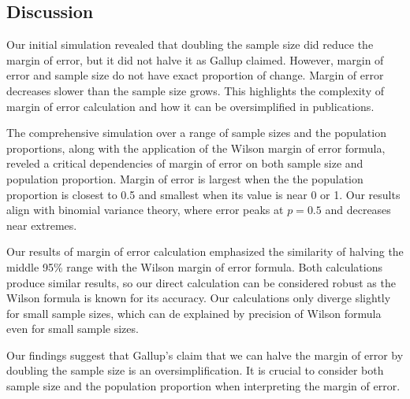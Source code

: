 \documentclass{article}\usepackage[]{graphicx}\usepackage[]{xcolor}
\begin{document}
\begin{multicols}{2}
\section{Discussion}\label{sec:discussion}
Our initial simulation revealed that doubling the sample size did reduce the margin of error, but it did not halve it as Gallup claimed. However, margin of error and sample size do not have exact proportion of change. Margin of error decreases slower than the sample size grows. This highlights the complexity of margin of error calculation and how it can be oversimplified in publications.

The comprehensive simulation over a range of sample sizes and the population proportions, along with the application of the Wilson margin of error formula, reveled a critical dependencies of margin of error on both sample size and population proportion. Margin of error is largest when the the population proportion is closest to 0.5 and smallest when its value is near 0 or 1. Our results align with binomial variance theory, where error peaks at $p = 0.5$ and decreases near extremes.

Our results of margin of error calculation emphasized the similarity of halving the middle 95\% range with the Wilson margin of error formula. Both calculations produce similar results, so our direct calculation can be considered robust as the Wilson formula is known for its accuracy. Our calculations only diverge slightly for small sample sizes, which can de explained by precision of Wilson formula even for small sample sizes.

Our findings suggest that Gallup's claim that we can halve the margin of error by doubling the sample size is an oversimplification. It is crucial to consider both sample size and the population proportion when interpreting the margin of error.

\vspace{2em}


\begin{tiny}

\end{tiny}
\end{multicols}

\newpage
\onecolumn
\end{document}
